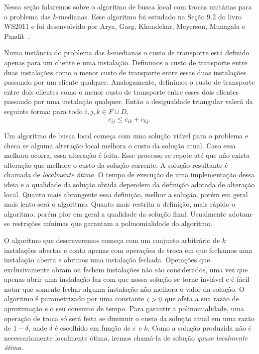 Nessa seção falaremos sobre o algoritmo de busca local com trocas unitárias para o problema das $k$-medianas. Esse algoritmo foi estudado na Seção 9.2 do livro WS2011 e foi desenvolvido por Arya, Garg, Khandekar, Meyerson, Munagala e Pandit~\cite{AryaLocal}.

Numa instância do problema das $k$-medianas o custo de transporte está definido apenas para um cliente e uma instalação.
Definimos o custo de transporte entre duas instalações como o menor custo de transporte entre essas duas instalações passando por um cliente qualquer. Analogamente, definimos o custo de transporte entre dois clientes como o menor custo de transporte entre esses dois clientes passando por uma instalação qualquer. Então a desigualdade triangular valerá da seguinte forma: para todo $i,j,k \in F \cup D$,
\[ c_{ij} \leq c_{ik} + c_{kj}.\]

Um algoritmo de busca local começa com uma solução viável para o problema e checa se alguma alteração local melhora o custo da solução atual. Caso essa melhora ocorra, essa alteração é feita. Esse processo se repete até que não exista alteração que melhore o custo da solução corrente. A solução resultante é chamada de \emph{localmente ótima}. O tempo de execução de uma implementação dessa ideia e a qualidade da solução obtida dependem da definição adotada de alteração local. Quanto mais abrangente essa definição, melhor a solução, porém em geral mais lento será o algoritmo. Quanto mais restrita a definição, mais rápido o algoritmo, porém pior em geral a qualidade da solução final. Usualmente adotam-se restrições mínimas que garantam a polinomialidade do algoritmo.

O algoritmo que descreveremos começa com um conjunto arbitrário de $k$ instalações abertas e conta apenas com operações de troca em que fechamos uma instalação aberta e abrimos uma instalação fechada. Operações que exclusivamente abram ou fechem instalações não são considerados, uma vez que apenas abrir uma instalação faz com que nossa solução se torne inviável e é fácil notar que somente fechar alguma instalação não melhora o valor da solução. O algoritmo é parametrizado por uma constante $\epsilon > 0$ que afeta a sua razão de aproximação e o seu consumo de tempo. Para garantir a polinomialidade, uma operação de troca só será feita se diminuir o custo da solução atual em uma razão de $1-\delta$, onde $\delta$ é escolhido em função de $\epsilon$ e $k$. Como a solução produzida não é necessariamente localmente ótima, iremos chamá-la de solução \emph{quase localmente ótima}.

